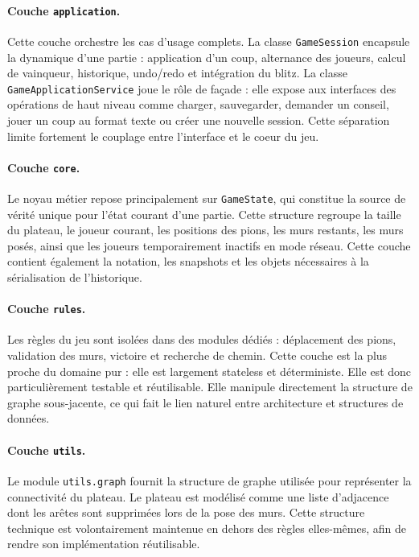 \paragraph{Couche \texttt{application}.}
Cette couche orchestre les cas d'usage complets. La classe
\texttt{GameSession} encapsule la dynamique d'une partie : application d'un
coup, alternance des joueurs, calcul de vainqueur, historique, undo/redo et
intégration du blitz. La classe \texttt{GameApplicationService} joue le rôle
de façade : elle expose aux interfaces des opérations de haut niveau comme
charger, sauvegarder, demander un conseil, jouer un coup au format texte ou
créer une nouvelle session. Cette séparation limite fortement le couplage
entre l'interface et le coeur du jeu.

\paragraph{Couche \texttt{core}.}
Le noyau métier repose principalement sur \texttt{GameState}, qui constitue la
source de vérité unique pour l'état courant d'une partie. Cette structure
regroupe la taille du plateau, le joueur courant, les positions des pions, les
murs restants, les murs posés, ainsi que les joueurs temporairement inactifs
en mode réseau. Cette couche contient également la notation, les snapshots et
les objets nécessaires à la sérialisation de l'historique.

\paragraph{Couche \texttt{rules}.}
Les règles du jeu sont isolées dans des modules dédiés : déplacement des
pions, validation des murs, victoire et recherche de chemin. Cette couche est
la plus proche du domaine pur : elle est largement stateless et déterministe.
Elle est donc particulièrement testable et réutilisable. Elle manipule
directement la structure de graphe sous-jacente, ce qui fait le lien naturel
entre architecture et structures de données.

\paragraph{Couche \texttt{utils}.}
Le module \texttt{utils.graph} fournit la structure de graphe utilisée pour
représenter la connectivité du plateau. Le plateau est modélisé comme une
liste d'adjacence dont les arêtes sont supprimées lors de la pose des murs.
Cette structure technique est volontairement maintenue en dehors des règles
elles-mêmes, afin de rendre son implémentation réutilisable.

